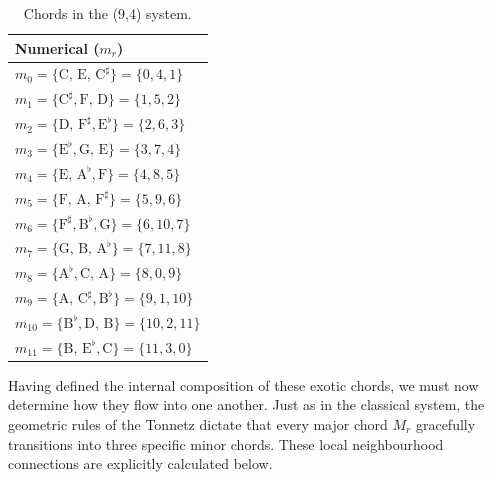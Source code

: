 \documentclass[11pt,letterpaper]{amsart}
\begin{document}
{\begin{table}[H]
\begin{minipage}{0.48\textwidth}
\begin{tabular}{l}
        \toprule
        \textbf{Numerical ($m_r$)} \\
        \midrule
        $m_0 = \{\text{C, E, C}^\sharp\} = \{0, 4, 1\}$ \\
        $m_1 = \{\text{C}^\sharp, \text{F, D}\} = \{1, 5, 2\}$ \\
        $m_2 = \{\text{D, F}^\sharp, \text{E}^\flat\} = \{2, 6, 3\}$ \\
        $m_3 = \{\text{E}^\flat, \text{G, E}\} = \{3, 7, 4\}$ \\
        $m_4 = \{\text{E, A}^\flat, \text{F}\} = \{4, 8, 5\}$ \\
        $m_5 = \{\text{F, A, F}^\sharp\} = \{5, 9, 6\}$ \\
        $m_6 = \{\text{F}^\sharp, \text{B}^\flat, \text{G}\} = \{6, 10, 7\}$ \\
        $m_7 = \{\text{G, B, A}^\flat\} = \{7, 11, 8\}$ \\
        $m_8 = \{\text{A}^\flat, \text{C, A}\} = \{8, 0, 9\}$ \\
        $m_9 = \{\text{A, C}^\sharp, \text{B}^\flat\} = \{9, 1, 10\}$ \\
        $m_{10} = \{\text{B}^\flat, \text{D, B}\} = \{10, 2, 11\}$ \\
        $m_{11} = \{\text{B, E}^\flat, \text{C}\} = \{11, 3, 0\}$ \\
        \bottomrule
        \end{tabular}
    \end{minipage}
    \caption{Chords in the (9,4) system.}
\end{table}}

Having defined the internal composition of these exotic chords, we must now determine how they flow into one another. Just as in the classical system, the geometric rules of the Tonnetz dictate that every major chord $M_r$ gracefully transitions into three specific minor chords. These local neighbourhood connections are explicitly calculated below.
\end{document}
